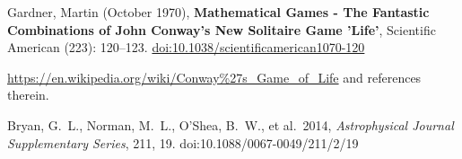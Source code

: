 \documentclass[11pt]{amsart}
\begin{document}

\begin{thebibliography}{2}
	
Gardner, Martin (October 1970), \textbf{Mathematical Games - The Fantastic Combinations of John Conway's New Solitaire Game 'Life'}, Scientific American (223): 120–123. \href{doi:10.1038/scientificamerican1070-120}{doi:10.1038/scientificamerican1070-120}

\href{https://en.wikipedia.org/wiki/Conway\%27s_Game_of_Life}{https://en.wikipedia.org/wiki/Conway\%27s\_Game\_of\_Life} and references therein.

 Bryan, G.~L., Norman, M.~L., O'Shea, B.~W., et al.\ 2014, \textit{Astrophysical Journal Supplementary Series}, 211, 19. doi:10.1088/0067-0049/211/2/19

\end{thebibliography}
\end{document}
